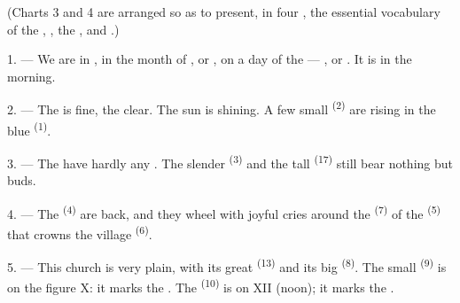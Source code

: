 %

\VUsaut{3.0mm}
\VUsaut{1.6mm}
\VUsaut{3.4mm}

(Charts 3 and 4 are arranged so as to present, in four
, the essential vocabulary of the ,
, the ,  and .)
\VUsaut{4.0mm}

\VUsaut{3.0mm}

\VUsaut{2.4mm}

\VUsaut{3.0mm}

1. --- We are in , in the month of ,
 or , on a day of the  ---
,  or . It is
 in the morning.

2. --- The  is fine, the  clear. The sun is shining. A few small
 \textsuperscript{(2)} are rising in the blue
 \textsuperscript{(1)}.

3. --- The  have hardly any . The slender
 \textsuperscript{(3)} and the tall 
\textsuperscript{(17)} still bear nothing but buds.

4. --- The  \textsuperscript{(4)} are back, and they wheel with joyful cries
around the  \textsuperscript{(7)} of the
 \textsuperscript{(5)} that crowns the village 
\textsuperscript{(6)}.

\VUsaut{3.4mm}
\VUsaut{3.0mm}

5. --- This church is very plain, with its great  \textsuperscript{(13)} and
its big  \textsuperscript{(8)}. The small
 \textsuperscript{(9)} is on the figure X: it marks the
. The  \textsuperscript{(10)} is on XII (noon); it
marks the .

